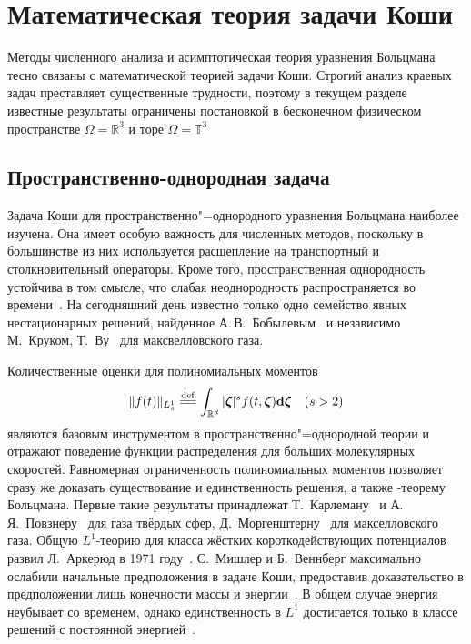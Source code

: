 \section{Математическая теория задачи Коши} \label{sect:cauchy}

Методы численного анализа и асимптотическая теория уравнения Больцмана тесно связаны
с математической теорией задачи Коши.
Строгий анализ краевых задач преставляет существенные трудности, поэтому в текущем разделе
известные результаты ограничены постановкой в бесконечном физическом пространстве \(\Omega=\mathbb{R}^3\)
и торе \(\Omega=\mathbb{T}^3\)

\subsection{Пространственно-однородная задача}

Задача Коши для пространственно"=однородного уравнения Больцмана наиболее изучена.
Она имеет особую важность для численных методов, поскольку в большинстве из них используется
расщепление на транспортный и столкновительный операторы.
Кроме того, пространственная однородность устойчива в том смысле, что
слабая неоднородность распространяется во времени~\cite{Arkeryd1987}.
На сегодняшний день известно только одно семейство явных нестационарных решений,
найденное А.\,В.~Бобылевым~\cite{Bobylev1975} и независимо М.~Круком, Т.~Ву~\cite{Krook1976} для максвелловского газа.

Количественные оценки для полиномиальных моментов
\begin{equation*}
    \|f(t)\|_{L^1_s} \eqdef \int_{\mathbb{R}^d} |\bzeta|^s f(t,\bzeta)\dzeta \quad (s>2)
\end{equation*}
являются базовым инструментом в пространственно"=однородной теории
и отражают поведение функции распределения для больших молекулярных скоростей.
Равномерная ограниченность полиномиальных моментов позволяет сразу же доказать
существование и единственность решения, а также -теорему Больцмана.
Первые такие результаты принадлежат Т.~Карлеману~\cite{Carleman1933} и А.\,Я.~Повзнеру~\cite{Povzner1962}
для газа твёрдых сфер, Д.~Моргенштерну~\cite{Morgenstern1954} для макселловского газа.
Общую \(L^1\)-теорию для класса жёстких короткодействующих потенциалов развил Л.~Аркерюд в 1971 году~\cite{Arkeryd1972}.
С.~Мишлер и Б.~Веннберг максимально ослабили начальные предположения в задаче Коши,
предоставив доказательство в предположении лишь конечности массы и энергии~\cite{Mischler1999}.
В общем случае энергия неубывает со временем, однако единственность в \(L^1\) достигается
только в классе решений с постоянной энергией~\cite{Wennberg1999}.

